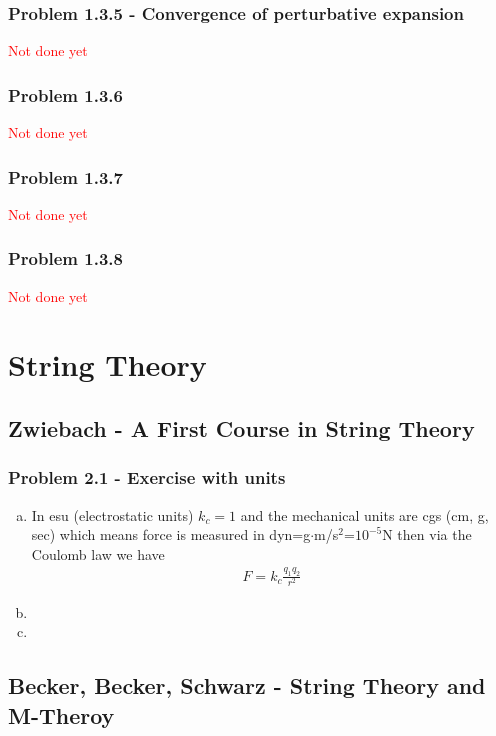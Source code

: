 \documentclass[10pt,a4paper]{book}
\theoremstyle{definition}
\begin{document}
\subsection{Problem 1.3.5 - Convergence of perturbative expansion}
\textcolor{red}{Not done yet}

\subsection{Problem 1.3.6}
\textcolor{red}{Not done yet}

\subsection{Problem 1.3.7}
\textcolor{red}{Not done yet}

\subsection{Problem 1.3.8}
\textcolor{red}{Not done yet}



\chapter{String Theory}
\section{{\sc Zwiebach} - A First Course in String Theory }

\subsection{Problem 2.1 - Exercise with units}
\begin{enumerate}[(a)]
\item In esu (electrostatic units) $k_c=1$ and the mechanical units are cgs (cm, g, sec) which means force is measured in dyn=g$\cdot$m/s$^2$=$10^{-5}$N then via the Coulomb law we have
\begin{align}
F=k_c\frac{q_1q_2}{r^2}
\end{align}



\item 
\item 
\end{enumerate}


\section{{\sc Becker, Becker, Schwarz} - String Theory and M-Theroy }
\end{document}
